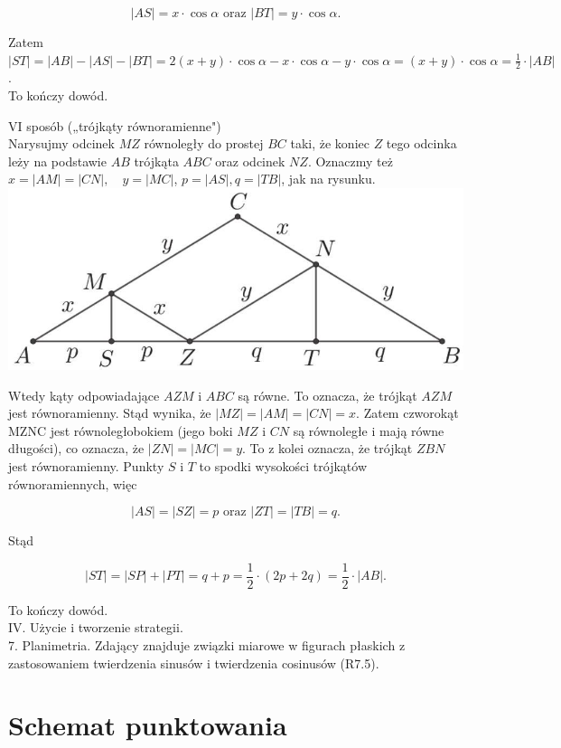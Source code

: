 \documentclass[10pt]{article}
\begin{document}
$$
|A S|=x \cdot \cos \alpha \text { oraz }|B T|=y \cdot \cos \alpha .
$$

Zatem\\
$|S T|=|A B|-|A S|-|B T|=2(x+y) \cdot \cos \alpha-x \cdot \cos \alpha-y \cdot \cos \alpha=(x+y) \cdot \cos \alpha=\frac{1}{2} \cdot|A B|$.\\
To kończy dowód.

VI sposób („trójkąty równoramienne")\\
Narysujmy odcinek $M Z$ równoległy do prostej $B C$ taki, że koniec $Z$ tego odcinka leży na podstawie $A B$ trójkąta $A B C$ oraz odcinek $N Z$. Oznaczmy też $x=|A M|=|C N|, \quad y=|M C|$, $p=|A S|, q=|T B|$, jak na rysunku.\\
\includegraphics[max width=\textwidth, center]{2025_02_07_d712b9a47aa2c64928dbg-19}

Wtedy kąty odpowiadające $A Z M$ i $A B C$ są równe. To oznacza, że trójkąt $A Z M$ jest równoramienny. Stąd wynika, że $|M Z|=|A M|=|C N|=x$. Zatem czworokąt MZNC jest równoległobokiem (jego boki $M Z$ i $C N$ są równoległe i mają równe długości), co oznacza, że $|Z N|=|M C|=y$. To z kolei oznacza, że trójkąt $Z B N$ jest równoramienny. Punkty $S$ i $T$ to spodki wysokości trójkątów równoramiennych, więc

$$
|A S|=|S Z|=p \text { oraz }|Z T|=|T B|=q .
$$

Stąd

$$
|S T|=|S P|+|P T|=q+p=\frac{1}{2} \cdot(2 p+2 q)=\frac{1}{2} \cdot|A B| .
$$

To kończy dowód.\\
IV. Użycie i tworzenie strategii.\\
7. Planimetria. Zdający znajduje związki miarowe w figurach płaskich z zastosowaniem twierdzenia sinusów i twierdzenia cosinusów (R7.5).

\section*{Schemat punktowania}
\end{document}
